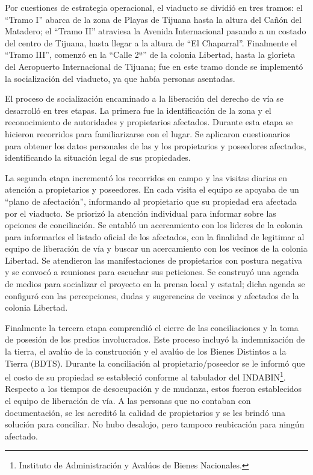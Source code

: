 \documentclass[
  spanish,
  11pt,
  a4paper,
]{scrbook}
\begin{document}
Por cuestiones de estrategia operacional, el viaducto se dividió en tres
tramos: el ``Tramo I'' abarca de la zona de Playas de Tijuana hasta la
altura del Cañón del Matadero; el ``Tramo II'' atraviesa la Avenida
Internacional pasando a un costado del centro de Tijuana, hasta llegar a
la altura de ``El Chaparral''. Finalmente el ``Tramo III'', comenzó en
la ``Calle 2ª'' de la colonia Libertad, hasta la glorieta del Aeropuerto
Internacional de Tijuana; fue en este tramo donde se implementó la
socialización del viaducto, ya que había personas asentadas.

El proceso de socialización encaminado a la liberación del derecho de
vía se desarrolló en tres etapas. La primera fue la identificación de la
zona y el reconocimiento de autoridades y propietarios afectados.
Durante esta etapa se hicieron recorridos para familiarizarse con el
lugar. Se aplicaron cuestionarios para obtener los datos personales de
las y los propietarios y poseedores afectados, identificando la
situación legal de sus propiedades.

La segunda etapa incrementó los recorridos en campo y las visitas
diarias en atención a propietarios y poseedores. En cada visita el
equipo se apoyaba de un ``plano de afectación'', informando al
propietario que su propiedad era afectada por el viaducto. Se priorizó
la atención individual para informar sobre las opciones de conciliación.
Se entabló un acercamiento con los lideres de la colonia para
informarles el listado oficial de los afectados, con la finalidad de
legitimar al equipo de liberación de vía y buscar un acercamiento con
los vecinos de la colonia Libertad. Se atendieron las manifestaciones de
propietarios con postura negativa y se convocó a reuniones para escuchar
sus peticiones. Se construyó una agenda de medios para socializar el
proyecto en la prensa local y estatal; dicha agenda se configuró con las
percepciones, dudas y sugerencias de vecinos y afectados de la colonia
Libertad.

Finalmente la tercera etapa comprendió el cierre de las conciliaciones y
la toma de posesión de los predios involucrados. Este proceso incluyó la
indemnización de la tierra, el avalúo de la construcción y el avalúo de
los Bienes Distintos a la Tierra (BDTS). Durante la conciliación al
propietario/poseedor se le informó que el costo de su propiedad se
estableció conforme al tabulador del INDABIN\footnote{Instituto de
  Administración y Avalúos de Bienes Nacionales.}. Respecto a los
tiempos de desocupación y de mudanza, estos fueron establecidos el
equipo de liberación de vía. A las personas que no contaban con
documentación, se les acreditó la calidad de propietarios y se les
brindó una solución para conciliar. No hubo desalojo, pero tampoco
reubicación para ningún afectado.
\end{document}
